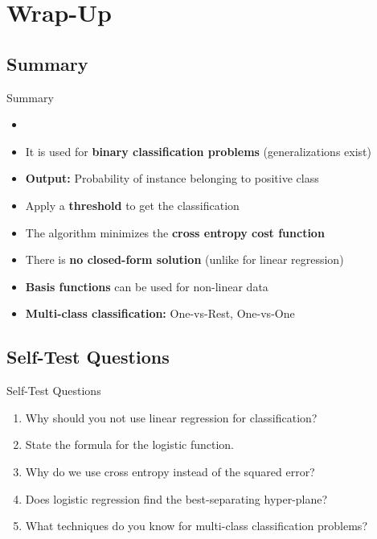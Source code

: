 \section{Wrap-Up}

\subsection{Summary}

\begin{frame}{Summary}{}
	\begin{itemize}
		\item {}
		\item It is used for \textbf{binary classification problems} (generalizations exist)
		\item \textbf{Output:} Probability of instance belonging to positive class
		\item Apply a \textbf{threshold} to get the classification
		\item The algorithm minimizes the \textbf{cross entropy cost function}
		\item There is \textbf{no closed-form solution} (unlike for linear regression)
		\item \textbf{Basis functions} can be used for non-linear data
		\item \textbf{Multi-class classification:} One-vs-Rest, One-vs-One
	\end{itemize}
\end{frame}


\subsection{Self-Test Questions}

\begin{frame}{Self-Test Questions}{}\important
	\begin{enumerate}
		\item Why should you not use linear regression for classification?
		\item State the formula for the logistic function.
		\item Why do we use cross entropy instead of the squared error?
		\item Does logistic regression find the best-separating hyper-plane?
		\item What techniques do you know for multi-class classification problems?
	\end{enumerate}
\end{frame}


